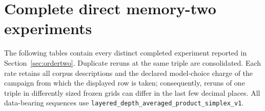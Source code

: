 \section{Complete direct memory-two experiments}
\label{app:memory-two-results}

The following tables contain every distinct completed experiment reported in
Section~\ref{sec:ordertwo}.  Duplicate reruns at the same triple are
consolidated.  Each rate retains all corpus descriptions and the declared
model-choice charge of the campaign from which the displayed row is taken;
consequently, reruns of one triple in differently sized frozen grids can
differ in the last few decimal places.  All data-bearing sequences use
\texttt{layered\_depth\_averaged\_product\_simplex\_v1}.

\begingroup
\footnotesize
\setlength{\tabcolsep}{5pt}
